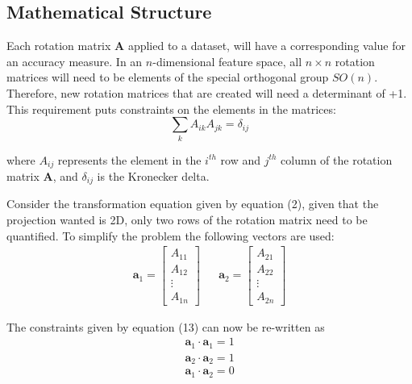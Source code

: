 \documentclass[a4paper,11pt,twoside]{article}
\begin{document}
\subsection{Mathematical Structure}

Each rotation matrix $\bm{A}$ applied to a dataset, will have a corresponding value for an accuracy measure. In an $n$-dimensional feature space, all $n\times n$ rotation matrices will need to be elements of the special orthogonal group $SO(n)$. Therefore, new rotation matrices that are created will need a determinant of +1. This requirement puts constraints on the elements in the matrices:
\begin{equation}
\sum_{k}A_{ik}A_{jk} = \delta_{ij}
\end{equation}

where $A_{ij}$ represents the element in the $i^{th}$ row and $j^{th}$ column of the rotation matrix $\bm{A}$, and $\delta_{ij}$ is the Kronecker delta. 
\newline

Consider the transformation equation given by equation (2), given that the projection wanted is 2D, only two rows of the rotation matrix need to be quantified. To simplify the problem the following vectors are used: 
\begin{align}
\bm{a}_1 = \begin{bmatrix}
           A_{11} \\
           A_{12} \\
           \vdots \\
           A_{1n}
           \end{bmatrix} 
           && 
\bm{a}_2 = \begin{bmatrix}
           A_{21} \\
           A_{22} \\
           \vdots \\
           A_{2n}
           \end{bmatrix}
\end{align} 

The constraints given by equation (13) can now be re-written as
\begin{equation}
\begin{split}
\bm{a}_1 \cdot \bm{a}_1 = 1 
\\
\bm{a}_2 \cdot \bm{a}_2 = 1
\end{split}
\end{equation}
\begin{equation}
\bm{a}_1 \cdot \bm{a}_2 = 0
\end{equation}
\end{document}
